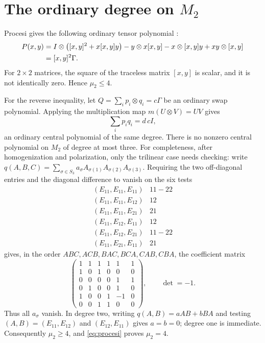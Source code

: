 \documentclass[11pt]{article}
\newcommand{\Id}{I}
\begin{document}
\section{The ordinary degree on $M_2$}

Procesi gives the following ordinary tensor polynomial
\cite[Section 3]{Procesi2022}:
\begin{align}\label{eq:procesi}
 P(x,y)={}&\Id\otimes\bigl([x,y]^2+x[x,y]y\bigr)
 -y\otimes x[x,y]-x\otimes[x,y]y+xy\otimes[x,y]\notag\\
 ={}&[x,y]^2\Gamma.
\end{align}
For $2\times2$ matrices, the square of the traceless matrix $[x,y]$ is
scalar, and it is not identically zero.  Hence $\mu_2\le4$.

For the reverse inequality, let
$Q=\sum_i p_i\otimes q_i=c\Gamma$ be an ordinary swap polynomial.  Applying
the multiplication map $m(U\otimes V)=UV$ gives
\[
                  \sum_i p_iq_i=d\,c\Id,
\]
an ordinary central polynomial of the same degree.  There is no nonzero
central polynomial on $M_2$ of degree at most three.  For completeness, after
homogenization and polarization, only the trilinear case needs checking:
write
$q(A,B,C)=\sum_{\sigma\in S_3}a_\sigma
A_{\sigma(1)}A_{\sigma(2)}A_{\sigma(3)}$.  Requiring the two off-diagonal
entries and the diagonal difference to vanish on the six tests
\[
\begin{array}{c|c}
(E_{11},E_{11},E_{11})&11-22\\
(E_{11},E_{11},E_{12})&12\\
(E_{11},E_{11},E_{21})&21\\
(E_{11},E_{12},E_{11})&12\\
(E_{11},E_{12},E_{21})&11-22\\
(E_{11},E_{21},E_{11})&21
\end{array}
\]
gives, in the order
$ABC,ACB,BAC,BCA,CAB,CBA$, the coefficient matrix
\[
\begin{pmatrix}
1&1&1&1&1&1\\1&0&1&0&0&0\\0&0&0&0&1&1\\
0&1&0&0&1&0\\1&0&0&1&-1&0\\0&0&1&1&0&0
\end{pmatrix},
\qquad \det=-1.
\]
Thus all $a_\sigma$ vanish.  In degree two, writing $q(A,B)=aAB+bBA$ and
testing $(A,B)=(E_{11},E_{12})$ and $(E_{12},E_{11})$ gives $a=b=0$;
degree one is immediate.  Consequently $\mu_2\ge4$, and
\eqref{eq:procesi} proves $\mu_2=4$.
\end{document}
